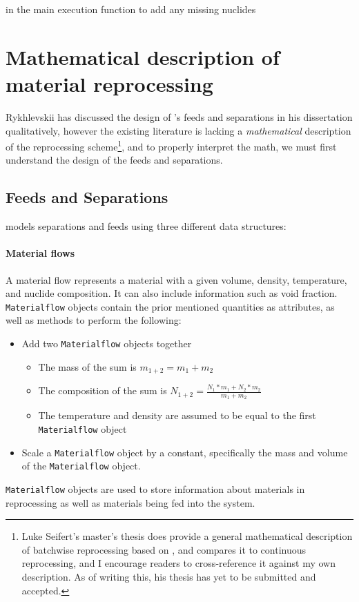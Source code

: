in the main execution function to add any missing nuclides

\section{Mathematical description of material reprocessing}
Rykhlevskii has discussed the design of \SaltProc's feeds and separations in
his dissertation qualitatively, however the existing \SaltProc literature is lacking a {\it mathematical} description of the reprocessing scheme\footnote{Luke Seifert's master's thesis does provide a general
mathematical description of batchwise reprocessing based on \SaltProc, and
compares it to continuous reprocessing, and I encourage readers to
cross-reference it against my own description. As of writing this, his thesis
has yet to be submitted and accepted.}, and to properly interpret the math, we
must first understand the design of the feeds and separations.

\subsection{Feeds and Separations}
\label{sub:feeds-separations}
\SaltProc models separations and feeds using three different data structures:

\paragraph{Material flows}
    A material flow represents a material with a given
    volume, density, temperature, and nuclide composition.
    It can also include information such as void fraction. \verb.Materialflow.
    objects contain the prior mentioned quantities as attributes, as well as
    methods to perform the following:
    \begin{itemize}
        \item Add two \verb.Materialflow. objects together
            \begin{itemize}
                \item The mass of the sum is $m_{1+2} = m_{1} + m_{2}$
                \item The composition of the sum is $N_{1+2} = \frac{N_{1} * m_{1} + N_{2} * m_{2}}{m_{1} + m_{2}}$
                \item The temperature and density are assumed to be equal to the
                    first \verb.Materialflow. object
            \end{itemize}
        \item Scale a \verb.Materialflow. object by a constant, specifically
            the mass and volume of the \verb.Materialflow. object.
    \end{itemize}
    \verb.Materialflow. objects are used to store information about materials
    in reprocessing as well as materials being fed into the system.

